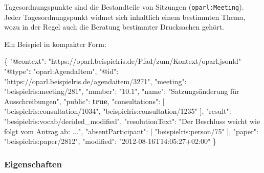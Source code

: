 \documentclass[,a4paper]{article}
\newenvironment{Shaded}{}{}
\newcommand{\KeywordTok}[1]{\textcolor[rgb]{0.00,0.44,0.13}{\textbf{{#1}}}}
\newcommand{\DataTypeTok}[1]{\textcolor[rgb]{0.56,0.13,0.00}{{#1}}}
\newcommand{\StringTok}[1]{\textcolor[rgb]{0.25,0.44,0.63}{{#1}}}
\newcommand{\OtherTok}[1]{\textcolor[rgb]{0.00,0.44,0.13}{{#1}}}
\newcommand{\FunctionTok}[1]{\textcolor[rgb]{0.02,0.16,0.49}{{#1}}}
\newcommand{\ErrorTok}[1]{\textcolor[rgb]{1.00,0.00,0.00}{\textbf{{#1}}}}
\begin{document}

Tagesordnungspunkte sind die Bestandteile von Sitzungen
(\texttt{oparl:Meeting}). Jeder Tagesordnungspunkt widmet sich
inhaltlich einem bestimmten Thema, wozu in der Regel auch die Beratung
bestimmter Drucksachen gehört.

Ein Beispiel in kompakter Form:

\begin{Shaded}
\begin{Highlighting}[]
\FunctionTok{\{}
    \DataTypeTok{"@context"}\FunctionTok{:} \StringTok{"https://oparl.beispielris.de/Pfad/zum/Kontext/oparl.jsonld"}
    \StringTok{"@type"}\ErrorTok{:} \StringTok{"oparl:AgendaItem"}\FunctionTok{,}
    \DataTypeTok{"@id"}\FunctionTok{:} \StringTok{"https://oparl.beispielris.de/agendaitem/3271"}\FunctionTok{,}
    \DataTypeTok{"meeting"}\FunctionTok{:} \StringTok{"beispielris:meeting/281"}\FunctionTok{,}
    \DataTypeTok{"number"}\FunctionTok{:} \StringTok{"10.1"}\FunctionTok{,}
    \DataTypeTok{"name"}\FunctionTok{:} \StringTok{"Satzungsänderung für Ausschreibungen"}\FunctionTok{,}
    \DataTypeTok{"public"}\FunctionTok{:} \KeywordTok{true}\FunctionTok{,}
    \DataTypeTok{"consultations"}\FunctionTok{:} \OtherTok{[}
        \StringTok{"beispielris:consultation/1034"}\OtherTok{,}
        \StringTok{"beispielris:consultation/1235"}
    \OtherTok{]}\FunctionTok{,}
    \DataTypeTok{"result"}\FunctionTok{:} \StringTok{"besipielris:vocab/decided_modified"}\FunctionTok{,}
    \DataTypeTok{"resolutionText"}\FunctionTok{:} \StringTok{"Der Beschluss weicht wie folgt vom Antrag ab: ..."}\FunctionTok{,}
    \DataTypeTok{"absentParticipant"}\FunctionTok{:} \OtherTok{[}
        \StringTok{"beispielris:person/75"}
    \OtherTok{]}\FunctionTok{,}
    \DataTypeTok{"paper"}\FunctionTok{:} \StringTok{"beispielris:paper/2812"}\FunctionTok{,}
    \DataTypeTok{"modified"}\FunctionTok{:} \StringTok{"2012-08-16T14:05:27+02:00"}
\FunctionTok{\}}
\end{Highlighting}
\end{Shaded}

\subsubsection{Eigenschaften}\label{eigenschaften-5}
\end{document}
